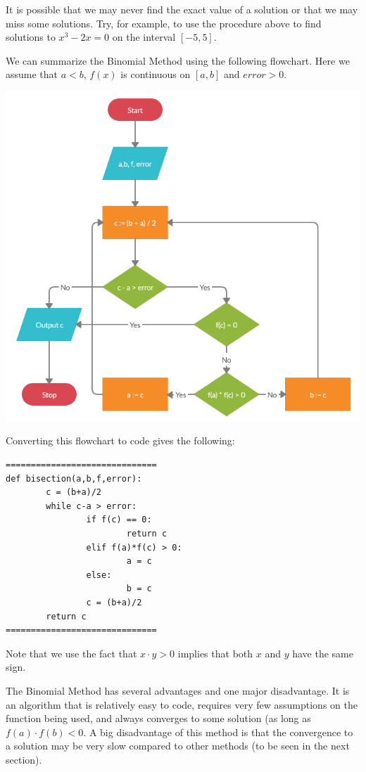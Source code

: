\documentclass{ximera}
\begin{document}
It is possible that we may never find the exact value of a solution or that we may miss some solutions. Try, for example, to use the procedure above to find solutions to $x^3-2x=0$ on the interval $[-5,5]$.

We can summarize the Binomial Method using the following flowchart. Here we assume that $a<b$, $f(x)$ is continuous on $[a,b]$ and $error>0$.

\begin{center}
	\includegraphics{bisection.png}
\end{center}

Converting this flowchart to code gives the following:

\begin{verbatim}
==============================
def bisection(a,b,f,error):
        c = (b+a)/2
        while c-a > error:
                if f(c) == 0:
                        return c
                elif f(a)*f(c) > 0:
                        a = c
                else:
                        b = c
                c = (b+a)/2
        return c
==============================
\end{verbatim}

Note that we use the fact that $x\cdot y>0$ implies that both $x$ and $y$ have the same sign.

The Binomial Method has several advantages and one major disadvantage. It is an algorithm that is relatively easy to code, requires very few assumptions on the function being used, and always converges to some solution (as long as $f(a)\cdot f(b) <0$. A big disadvantage of this method is that the convergence to a solution may be very slow compared to other methods (to be seen in the next section).
\end{document}
